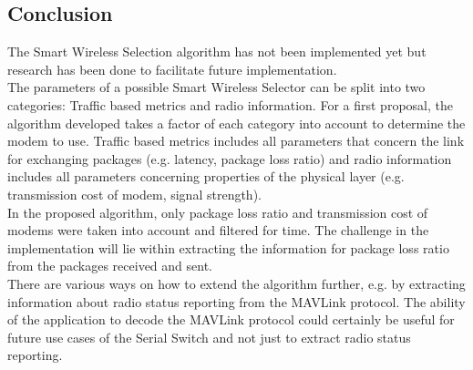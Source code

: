 \subsection{Conclusion}
The Smart Wireless Selection algorithm has not been implemented yet but research has been done to facilitate future implementation.\\
The parameters of a possible Smart Wireless Selector can be split into two categories: Traffic based metrics and radio information. For a first proposal, the algorithm developed takes a factor of each category into account to determine the modem to use. Traffic based metrics includes all parameters that concern the link for exchanging packages (e.g. latency, package loss ratio) and radio information includes all parameters concerning properties of the physical layer (e.g. transmission cost of modem, signal strength).\\
In the proposed algorithm, only package loss ratio and transmission cost of modems were taken into account and filtered for time. The challenge in the implementation will lie within extracting the information for package loss ratio from the packages received and sent.\\
There are various ways on how to extend the algorithm further, e.g. by extracting information about radio status reporting from the MAVLink protocol. The ability of the application to decode the MAVLink protocol could certainly be useful for future use cases of the Serial Switch and not just to extract radio status reporting.